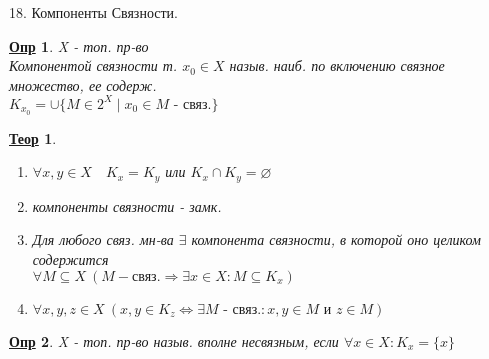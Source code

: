 \documentclass[12pt, fleqn]{article}
\newenvironment{question}[1]{\hspace*{-4em} #1}{\newpage}
\newcommand{\ra}{\Rightarrow}
\newcommand{\rla}{\Leftrightarrow}
\newcommand{\q}{\quad}
\theoremstyle{nonumbermarginbreak}
\newtheorem{theorem}{\hspace*{-2em}\underline{\bfseries Теор}}[section]
\newtheorem{definition}{\hspace*{-2em}\underline{\bfseries Опр}}[section]
\begin{document}
    \begin{question}{18. Компоненты Связности.}
        \begin{definition} 
            X - топ. пр-во\\
            Компонентой связности т. $x_0 \in X$ назыв. наиб. по включению
            связное множество, ее содерж.\\
            $K_{x_0} = \cup \{M \in 2^X  \mid x_0 \in M \text{ - связ.}\}$
        \end{definition}

        \begin{theorem} 
            \begin{enumerate}
                \item $\forall x, y \in X \q K_x = K_y$ или $K_x \cap K_y = \varnothing$
                \item компоненты связности - замк.
                \item Для любого связ. мн-ва $\exists$ компонента связности, в которой оно
                целиком содержится\\
                $\forall M \subseteq X \ (M - \text{связ.} \ra \exists x \in X: M \subseteq K_x)$
                \item $\forall x, y, z \in X \ (x, y \in K_z \rla \exists M \text{ - связ.}: 
                x, y \in M \text{ и } z \in M)$
            \end{enumerate}
        \end{theorem}

        \begin{definition} 
            X - топ. пр-во назыв. вполне несвязным, если $\forall x \in X: K_x = \{x\}$
        \end{definition}
    \end{question}
\end{document}
